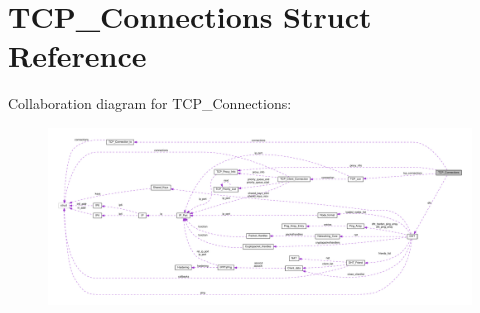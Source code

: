 \hypertarget{struct_t_c_p___connections}{\section{T\+C\+P\+\_\+\+Connections Struct Reference}
\label{struct_t_c_p___connections}
}


Collaboration diagram for T\+C\+P\+\_\+\+Connections\+:\nopagebreak
\begin{figure}[H]
\begin{center}
\leavevmode
\includegraphics[width=350pt]{struct_t_c_p___connections__coll__graph}
\end{center}
\end{figure}
